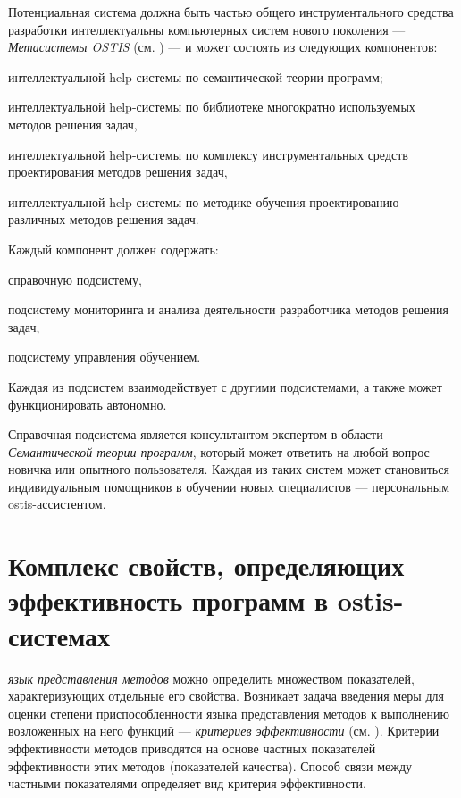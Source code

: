 Потенциальная система должна быть частью общего инструментального средства разработки интеллектуальны компьютерных систем нового поколения --- \textit{Метасистемы OSTIS} (см. ) --- и может состоять из следующих компонентов:
\begin{textitemize}
	\item интеллектуальной help-системы по семантической теории программ;
	\item интеллектуальной help-системы по библиотеке многократно используемых методов решения задач,
	\item интеллектуальной help-системы по комплексу инструментальных средств проектирования  методов решения задач,
	\item интеллектуальной help-системы по методике обучения проектированию различных методов решения задач.
\end{textitemize}

Каждый компонент должен содержать:
\begin{textitemize}
	\item справочную подсистему,
	\item подсистему мониторинга и анализа деятельности разработчика методов решения задач,
	\item подсистему управления обучением.
\end{textitemize}

Каждая из подсистем взаимодействует с другими подсистемами, а также может функционировать автономно.

Справочная подсистема является консультантом-экспертом в области \textit{Семантической теории программ}, который может ответить на любой вопрос новичка или опытного пользователя. Каждая из таких систем может становиться индивидуальным помощников в обучении новых специалистов --- персональным ostis-ассистентом.

\section{Комплекс свойств, определяющих эффективность программ в ostis-системах}
\label{sec_programs_method_kriteria}

\textit{язык представления методов} можно определить множеством показателей, характеризующих отдельные его свойства. Возникает задача введения меры для оценки степени приспособленности языка представления методов к выполнению возложенных на него функций --- \textit{критериев эффективности} (см. ). Критерии эффективности методов приводятся на основе частных показателей эффективности этих методов (показателей качества). Способ связи между частными показателями определяет вид критерия эффективности.

